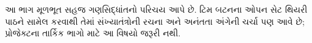 \documentclass[../../include/open-logic-part]{subfiles}
\begin{document}

\begin{editorial}
  આ ભાગ મૂળભૂત સહજ ગણસિદ્ધાંતનો પરિચય આપે છે.
  ટિમ બટનના ઓપન સેટ થિયરી પાઠને સામેલ કરવાથી તેમાં
  સંખ્યાતંત્રોની રચના અને અનંતતા અંગેની ચર્ચા પણ આવે છે;
  પ્રોજેક્ટના તાર્કિક ભાગો માટે આ વિષયો જરૂરી નથી.
\end{editorial}







\OLEndPartHook
\end{document}
